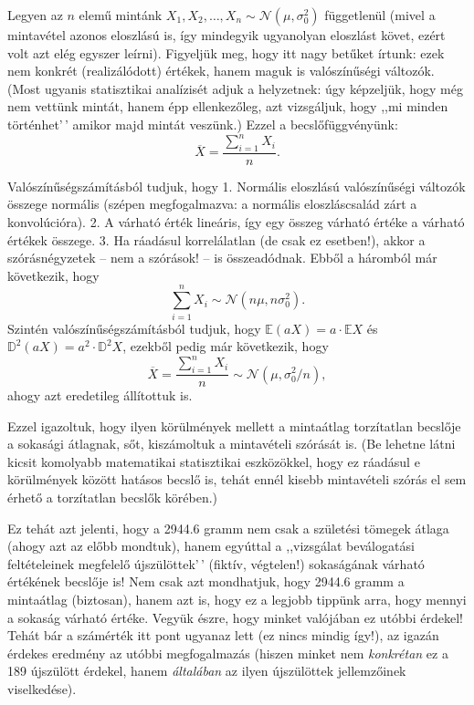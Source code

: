 \documentclass[
]{book}
\begin{document}
Legyen az \(n\) elemű mintánk \(X_1,X_2,\ldots,X_n\sim\mathcal{N}\left(\mu,\sigma_0^2\right)\) függetlenül (mivel a mintavétel azonos eloszlású is, így mindegyik ugyanolyan eloszlást követ, ezért volt azt elég egyszer leírni). Figyeljük meg, hogy itt nagy betűket írtunk: ezek nem konkrét (realizálódott) értékek, hanem maguk is valószínűségi változók. (Most ugyanis statisztikai analízisét adjuk a helyzetnek: úgy képzeljük, hogy még nem vettünk mintát, hanem épp ellenkezőleg, azt vizsgáljuk, hogy ,,mi minden történhet'\,' amikor majd mintát veszünk.) Ezzel a becslőfüggvényünk:
\[
    \overline{X}=\frac{\sum_{i=1}^n X_i}{n}.
\]

Valószínűségszámításból tudjuk, hogy
1. Normális eloszlású valószínűségi változók összege normális (szépen megfogalmazva: a normális eloszláscsalád zárt a konvolúcióra).
2. A várható érték lineáris, így egy összeg várható értéke a várható értékek összege.
3. Ha ráadásul korrelálatlan (de csak ez esetben!), akkor a szórásnégyzetek -- nem a szórások! -- is összeadódnak.
Ebből a háromból már következik, hogy
\[
    \sum_{i=1}^n X_i\sim\mathcal{N}\left(n\mu,n\sigma_0^2\right).
\]
Szintén valószínűségszámításból tudjuk, hogy \(\mathbb{E}\left(aX\right)=a \cdot \mathbb{E}X\) és \(\mathbb{D}^2\left(aX\right)=a^2 \cdot \mathbb{D}^2 X\), ezekből pedig már következik, hogy
\[
    \overline{X}=\frac{\sum_{i=1}^n X_i}{n} \sim \mathcal{N}\left(\mu,\sigma_0^2/n\right),
\]
ahogy azt eredetileg állítottuk is.

Ezzel igazoltuk, hogy ilyen körülmények mellett a mintaátlag torzítatlan becslője a sokasági átlagnak, sőt, kiszámoltuk a mintavételi szórását is. (Be lehetne látni kicsit komolyabb matematikai statisztikai eszközökkel, hogy ez ráadásul e körülmények között hatásos becslő is, tehát ennél kisebb mintavételi szórás el sem érhető a torzítatlan becslők körében.)

Ez tehát azt jelenti, hogy a 2944.6 gramm nem csak a születési tömegek átlaga (ahogy azt az előbb mondtuk), hanem egyúttal a ,,vizsgálat beválogatási feltételeinek megfelelő újszülöttek'\,' (fiktív, végtelen!) sokaságának várható értékének becslője is! Nem csak azt mondhatjuk, hogy 2944.6 gramm a mintaátlag (biztosan), hanem azt is, hogy ez a legjobb tippünk arra, hogy mennyi a sokaság várható értéke. Vegyük észre, hogy minket valójában ez utóbbi érdekel! Tehát bár a számérték itt pont ugyanaz lett (ez nincs mindig így!), az igazán érdekes eredmény az utóbbi megfogalmazás (hiszen minket nem \emph{konkrétan} ez a 189 újszülött érdekel, hanem \emph{általában} az ilyen újszülöttek jellemzőinek viselkedése).
\end{document}
